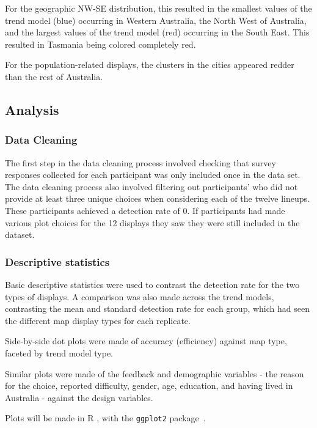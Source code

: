 \documentclass[journal]{vgtc}                     %
\begin{document}
For the geographic NW-SE distribution, this resulted in the smallest values of the trend model (blue) occurring in Western Australia, the North West of Australia, and the largest values of the trend model (red) occurring in the South East. This resulted in Tasmania being colored completely red.

For the population-related displays, the clusters in the cities appeared redder than the rest of Australia.

\hypertarget{analysis}{%
\subsection{Analysis}\label{analysis}}

\hypertarget{data-cleaning}{%
\subsubsection{Data Cleaning}\label{data-cleaning}}

The first step in the data cleaning process involved checking that survey responses collected for each participant was only included once in the data set.
The data cleaning process also involved filtering out participants' who did not provide at least three unique choices when considering each of the twelve lineups. These participants achieved a detection rate of 0. If participants had made various plot choices for the 12 displays they saw they were still included in the dataset.

\hypertarget{descriptive-statistics}{%
\subsubsection{Descriptive statistics}\label{descriptive-statistics}}

Basic descriptive statistics were used to contrast the detection rate for the two types of displays. A comparison was also made across the trend models, contrasting the mean and standard detection rate for each group, which had seen the different map display types for each replicate.

Side-by-side dot plots were made of accuracy (efficiency) against map type, faceted by trend model type.

Similar plots were made of the feedback and demographic variables - the reason for the choice, reported difficulty, gender, age, education, and having lived in Australia - against the design variables.

Plots will be made in R \cite{RCore}, with the \texttt{ggplot2} package~\cite{ggplot2}.
\end{document}
